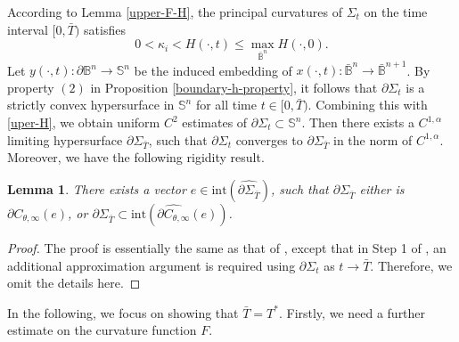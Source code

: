 \documentclass[11pt,reqno]{amsart}
\newtheorem{lem}[thm]{Lemma}
\theoremstyle{definition}
\theoremstyle{remark}
\numberwithin{equation}{section}
\renewcommand{\(}{\left(}
\renewcommand{\)}{\right)}
\renewcommand{\-}{\overline}
\begin{document}
According to Lemma \ref{upper-F-H}, the principal curvatures of $\Sigma_t$ on the time  interval $[0,\bar{T})$ satisfies 
\begin{equation}\label{uper-H}
	0<\kappa_i<H(\cdot,t)\leq \max_{\bar{\mathbb{B}}^n} H(\cdot,0).
\end{equation}
Let $y(\cdot,t):\partial\mathbb{B}^n\to\mathbb{S}^n$ be the induced embedding of $x(\cdot,t):\bar{\mathbb{B}}^{n}\to\bar{\mathbb{B}}^{n+1}$. By property $(2)$ in Proposition \ref{boundary-h-property}, it follows that $\partial\Sigma_t$ is a strictly convex hypersurface in $\mathbb{S}^n$ for all time $t\in[0,\bar{T})$. Combining this with \eqref{uper-H}, we  obtain uniform $C^2$ estimates of $\partial\Sigma_t\subset\mathbb{S}^n$. Then there exists a $C^{1,\alpha}$ limiting hypersurface $\partial\Sigma_{\bar{T}}$, such that $\partial\Sigma_t$ converges to $\partial\Sigma_{\bar{T}}$ in the norm of $C^{1,\alpha}$. Moreover, we have the following rigidity result.

\begin{lem}\label{lem-rigidity}
	There exists a vector $e\in \mathrm{int}(\widehat{\partial\Sigma_{\bar{T}}})$, such that $\partial\Sigma_{\bar{T}}$ either is $\partial C_{\theta,\infty}(e)$, or $\partial\Sigma_{\bar{T}}\subset\mathrm{int}(\widehat{\partial C_{\theta,\infty}}(e))$.
\end{lem}
\begin{proof}
	The proof is essentially the same as that of \cite[Lemma A.1]{HWYZ-2023}, except that in Step 1 of  \cite[Lemma A.1]{HWYZ-2023}, an additional approximation argument is required using $\partial\Sigma_t$ as $t\to\bar{T}$. Therefore, we omit the details here.
\end{proof}
In the following, we focus on showing that $\bar{T}=T^{*}$. Firstly, we need a further estimate on the curvature function $F$.
\end{document}
